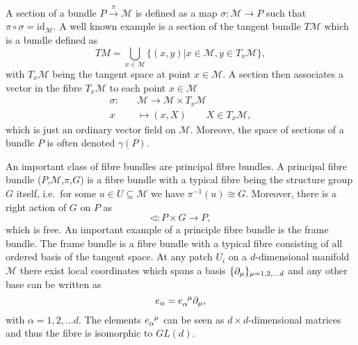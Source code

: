 A section of a bundle $P\overset{\pi}{\longrightarrow}\mathcal{M}$ is defined as a map $\sigma: \mathcal{M}\to P$ such that $\pi\circ\sigma = \text{id}_{\mathcal{M}}$. A well known example is a section of the tangent bundle $T\mathcal{M}$ which is a bundle defined as
\begin{equation}
    TM = \bigcup_{x\in \mathcal{M}}\{(x,y)|x\in\mathcal{M}, y\in T_x\mathcal{M} \},
\end{equation}
with $T_x\mathcal{M}$ being the tangent space at point $x\in\mathcal{M}$. A section then associates a vector in the fibre $T_x\mathcal{M}$ to each point $x\in\mathcal{M}$
\begin{equation}
    \begin{aligned}
        \sigma:\quad &\mathcal{M}\to \mathcal{M}\times T_x\mathcal{M}\\
                x&\mapsto (x,X)\qquad X\in T_x\mathcal{M},
    \end{aligned}
\end{equation}
which is just an ordinary vector field on $\mathcal{M}$. Moreove, the space of sections of a bundle $P$ is often denoted $\gamma(P)$. 


An important class of fibre bundles are principal fibre bundles. A principal fibre bundle ($P$,$\mathcal{M}$,$\pi$,$G$) is a fibre bundle with a typical fibre being the structure group $G$ itself, i.e.\ for some $u\in U\subseteq \mathcal{M}$ we have $\pi^{-1}(u)\cong G$. Moreover, there is a right action of $G$ on $P$ as 
\begin{equation}
    \triangleleft: P\times G \to P,
\end{equation}
which is free. An important example of a principle fibre bundle is the frame bundle. The frame bundle is a fibre bundle with a typical fibre consisting of all ordered basis of the tangent space. At any patch $U_i$ on a $d$-dimensional manifold $\mathcal{M}$ there exist local coordinates which spans a basis $\{\partial_\mu\}_{\mu=1,2,\ldots d}$ and any other base can be written as 
\begin{equation}
    e_\alpha = \tensor{e}{_\alpha^\mu}\pd_\mu,
\end{equation}
with $\alpha=1,2,\ldots d$. The elements $\tensor{e}{_\alpha^\mu}$ can be seen as $d\times d$-dimensional matrices and thus the fibre is isomorphic to $GL(d)$. 

